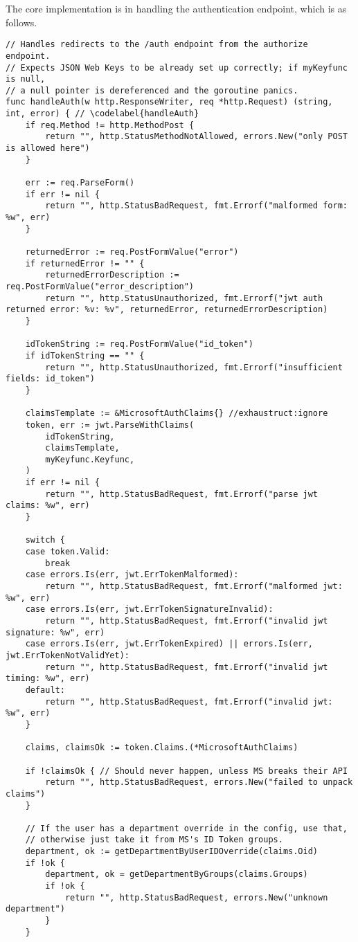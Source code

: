 The core implementation is in handling the authentication endpoint, which is as follows.

\begin{verbatim}
// Handles redirects to the /auth endpoint from the authorize endpoint.
// Expects JSON Web Keys to be already set up correctly; if myKeyfunc is null,
// a null pointer is dereferenced and the goroutine panics.
func handleAuth(w http.ResponseWriter, req *http.Request) (string, int, error) { // \codelabel{handleAuth}
	if req.Method != http.MethodPost {
		return "", http.StatusMethodNotAllowed, errors.New("only POST is allowed here")
	}

	err := req.ParseForm()
	if err != nil {
		return "", http.StatusBadRequest, fmt.Errorf("malformed form: %w", err)
	}

	returnedError := req.PostFormValue("error")
	if returnedError != "" {
		returnedErrorDescription := req.PostFormValue("error_description")
		return "", http.StatusUnauthorized, fmt.Errorf("jwt auth returned error: %v: %v", returnedError, returnedErrorDescription)
	}

	idTokenString := req.PostFormValue("id_token")
	if idTokenString == "" {
		return "", http.StatusUnauthorized, fmt.Errorf("insufficient fields: id_token")
	}

	claimsTemplate := &MicrosoftAuthClaims{} //exhaustruct:ignore
	token, err := jwt.ParseWithClaims(
		idTokenString,
		claimsTemplate,
		myKeyfunc.Keyfunc,
	)
	if err != nil {
		return "", http.StatusBadRequest, fmt.Errorf("parse jwt claims: %w", err)
	}

	switch {
	case token.Valid:
		break
	case errors.Is(err, jwt.ErrTokenMalformed):
		return "", http.StatusBadRequest, fmt.Errorf("malformed jwt: %w", err)
	case errors.Is(err, jwt.ErrTokenSignatureInvalid):
		return "", http.StatusBadRequest, fmt.Errorf("invalid jwt signature: %w", err)
	case errors.Is(err, jwt.ErrTokenExpired) || errors.Is(err, jwt.ErrTokenNotValidYet):
		return "", http.StatusBadRequest, fmt.Errorf("invalid jwt timing: %w", err)
	default:
		return "", http.StatusBadRequest, fmt.Errorf("invalid jwt: %w", err)
	}

	claims, claimsOk := token.Claims.(*MicrosoftAuthClaims)

	if !claimsOk { // Should never happen, unless MS breaks their API
		return "", http.StatusBadRequest, errors.New("failed to unpack claims")
	}

	// If the user has a department override in the config, use that,
	// otherwise just take it from MS's ID Token groups.
	department, ok := getDepartmentByUserIDOverride(claims.Oid)
	if !ok {
		department, ok = getDepartmentByGroups(claims.Groups)
		if !ok {
			return "", http.StatusBadRequest, errors.New("unknown department")
		}
	}


\end{verbatim}
